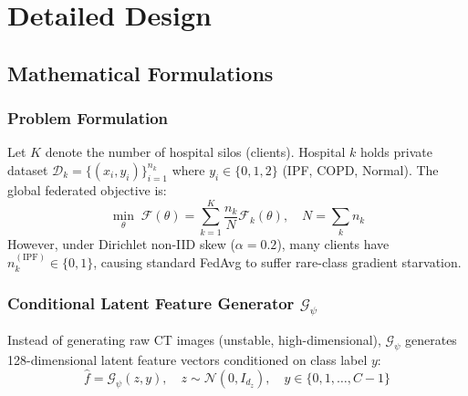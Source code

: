 \documentclass[12pt,a4paper]{report}
\begin{document}
\newpage

\chapter{Detailed Design}
\label{ch:design}

\section{Mathematical Formulations}

\subsection{Problem Formulation}
Let $K$ denote the number of hospital silos (clients). Hospital $k$ holds private dataset $\mathcal{D}_k = \{(x_i, y_i)\}_{i=1}^{n_k}$ where $y_i \in \{0, 1, 2\}$ (IPF, COPD, Normal). The global federated objective is:
\begin{equation}
    \min_{\theta} \; \mathcal{F}(\theta) = \sum_{k=1}^{K} \frac{n_k}{N} \mathcal{F}_k(\theta), \quad N = \sum_k n_k
    \label{eq:global_obj}
\end{equation}
However, under Dirichlet non-IID skew ($\alpha=0.2$), many clients have $n_k^{(\text{IPF})} \in \{0, 1\}$, causing standard FedAvg to suffer rare-class gradient starvation.

\subsection{Conditional Latent Feature Generator $\mathcal{G}_\psi$}
Instead of generating raw CT images (unstable, high-dimensional), $\mathcal{G}_\psi$ generates 128-dimensional latent feature vectors conditioned on class label $y$:
\begin{equation}
    \hat{f} = \mathcal{G}_\psi(z, y), \quad z \sim \mathcal{N}(0, I_{d_z}), \quad y \in \{0, 1, \ldots, C-1\}
    \label{eq:gen_forward}
\end{equation}
\end{document}
